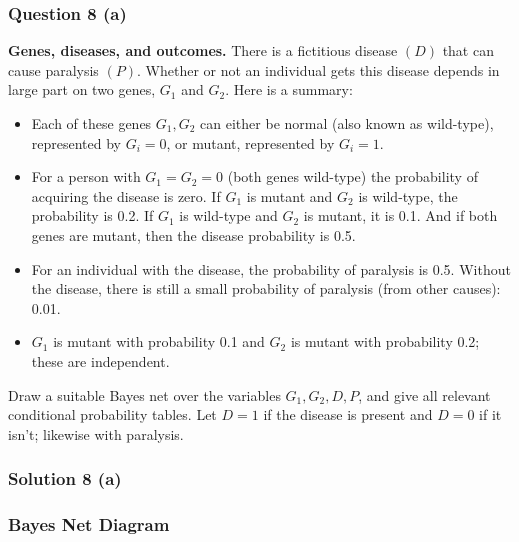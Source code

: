 \documentclass{article}
\begin{document}
\subsubsection*{Question 8 (a)}
\begin{flushleft}
    \textbf{Genes, diseases, and outcomes.} There is a fictitious disease $(D)$ that can cause paralysis $(P)$. 
    Whether or not an individual gets this disease depends in large part on two genes, $G_1$ and $G_2$. 
    Here is a summary: 

    \begin{itemize}
    \item Each of these genes $G_1, G_2$ can either be normal (also known as wild-type), represented by $G_i=0$, or mutant, represented by $G_i=1$. 
    \item For a person with $G_1=G_2=0$ (both genes wild-type) the probability of acquiring the disease is zero. 
    If $G_1$ is mutant and $G_2$ is wild-type, the probability is 0.2. 
    If $G_1$ is wild-type and $G_2$ is mutant, it is 0.1. 
    And if both genes are mutant, then the disease probability is 0.5. 
    \item For an individual with the disease, the probability of paralysis is 0.5. 
    Without the disease, there is still a small probability of paralysis (from other causes): 0.01. 
    \item $G_1$ is mutant with probability 0.1 and $G_2$ is mutant with probability 0.2; these are independent. 
    \end{itemize}

    Draw a suitable Bayes net over the variables $G_1, G_2, D, P$, and give all relevant conditional probability tables. 
    Let $D=1$ if the disease is present and $D=0$ if it isn't; likewise with paralysis. 
\end{flushleft}

\subsubsection*{Solution 8 (a)}

\subsubsection*{Bayes Net Diagram}

\end{document}
